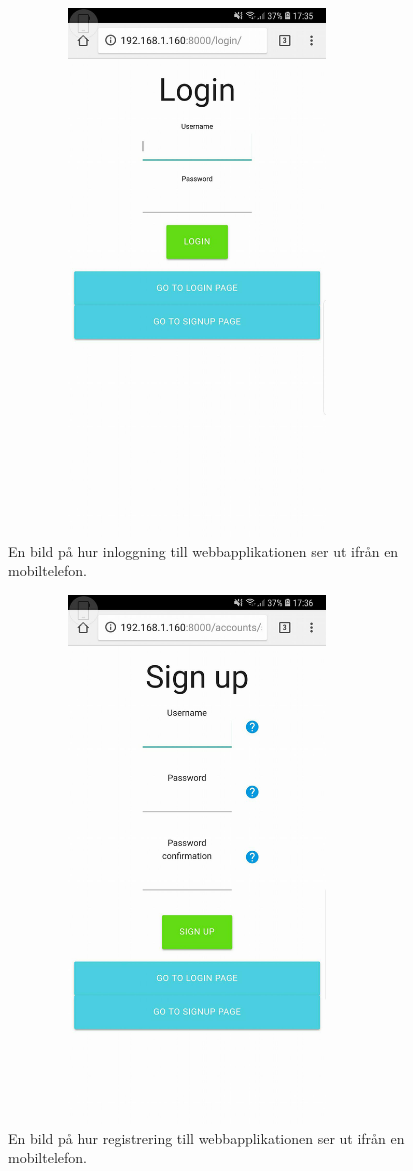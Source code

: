 \documentclass[swedish, a4paper,12pt]{article}
\begin{document}
\begin{figure}[H]
  \centering
  \includegraphics[width=10cm, height=14cm]{media/mob_login.jpg}
  \caption{En bild på hur inloggning till webbapplikationen ser ut ifrån en mobiltelefon.}
  \label{fig:mob_login}
\end{figure}

\begin{figure}[H]
  \centering
  \includegraphics[width=10cm, height=14cm]{media/mob_sign_up.jpg}
  \caption{En bild på hur registrering till webbapplikationen ser ut ifrån en mobiltelefon.}
  \label{fig:mob_sign_up}
\end{figure}
\end{document}

